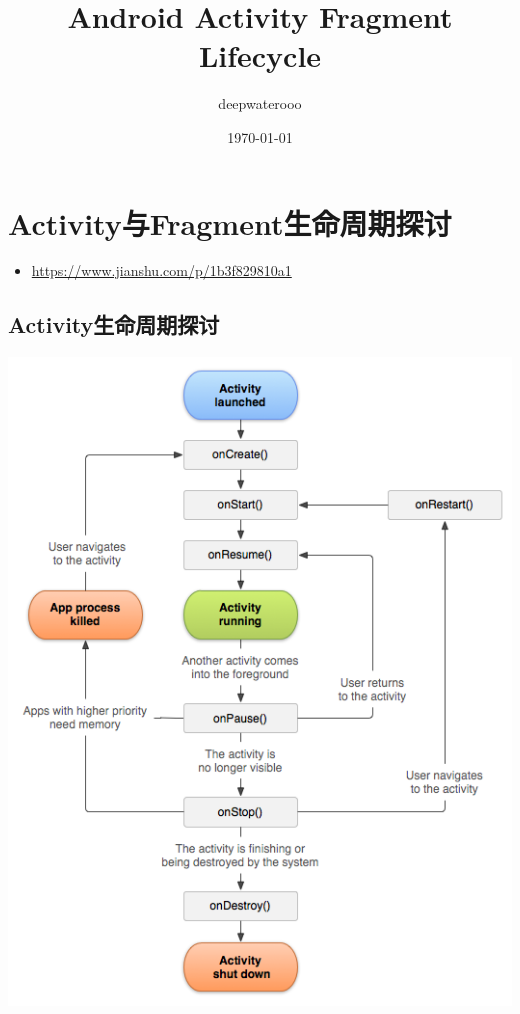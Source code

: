 \documentclass[9pt, b5paper]{article}
\author{deepwaterooo}
\date{\today}
\title{Android Activity Fragment Lifecycle}
\begin{document}
\maketitle
\tableofcontents


\section{Activity与Fragment生命周期探讨}
\label{sec-1}
\begin{itemize}
\item \url{https://www.jianshu.com/p/1b3f829810a1}
\end{itemize}
\subsection{Activity生命周期探讨}
\label{sec-1-1}

\includegraphics[width=.9\linewidth]{./pic/activityLifeCycle.png}
\end{document}
